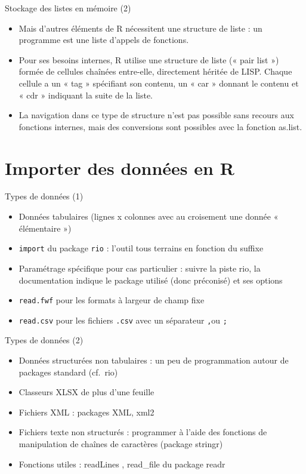 \documentclass[
  ignorenonframetext,
]{beamer}
\providecommand{\tightlist}{%
  \setlength{\itemsep}{0pt}\setlength{\parskip}{0pt}}
\begin{document}
\begin{frame}{Stockage des listes en mémoire (2)}
\protect\hypertarget{stockage-des-listes-en-muxe9moire-2}{}
\begin{itemize}
\tightlist
\item
  Mais d'autres éléments de R nécessitent une structure de liste : un
  programme est une liste d'appels de fonctions.
\item
  Pour ses besoins internes, R utilise une structure de liste (« pair
  list ») formée de cellules chaînées entre-elle, directement héritée de
  LISP. Chaque cellule a un « tag » spécifiant son contenu, un « car »
  donnant le contenu et « cdr » indiquant la suite de la liste.
\item
  La navigation dans ce type de structure n'est pas possible sans
  recours aux fonctions internes, mais des conversions sont possibles
  avec la fonction as.list.
\end{itemize}
\end{frame}

\hypertarget{importer-des-donnuxe9es-en-r}{%
\section{Importer des données en R}\label{importer-des-donnuxe9es-en-r}}

\begin{frame}[fragile]{Types de données (1)}
\protect\hypertarget{types-de-donnuxe9es-1}{}
\begin{itemize}
\tightlist
\item
  Données tabulaires (lignes x colonnes avec au croisement une donnée «
  élémentaire »)
\item
  \texttt{import} du package \texttt{rio} : l'outil tous terrains en
  fonction du suffixe
\item
  Paramétrage spécifique pour cas particulier : suivre la piste rio, la
  documentation indique le package utilisé (donc préconisé) et ses
  options
\item
  \texttt{read.fwf} pour les formats à largeur de champ fixe
\item
  \texttt{read.csv} pour les fichiers \texttt{.csv} avec un séparateur
  \texttt{,}ou \texttt{;}
\end{itemize}
\end{frame}

\begin{frame}{Types de données (2)}
\protect\hypertarget{types-de-donnuxe9es-2}{}
\begin{itemize}
\tightlist
\item
  Données structurées non tabulaires : un peu de programmation autour de
  packages standard (cf.~rio)
\item
  Classeurs XLSX de plus d'une feuille
\item
  Fichiers XML : packages XML, xml2
\item
  Fichiers texte non structurés : programmer à l'aide des fonctions de
  manipulation de chaînes de caractères (package stringr)
\item
  Fonctions utiles : readLines , read\_file du package readr
\end{itemize}
\end{frame}
\end{document}
